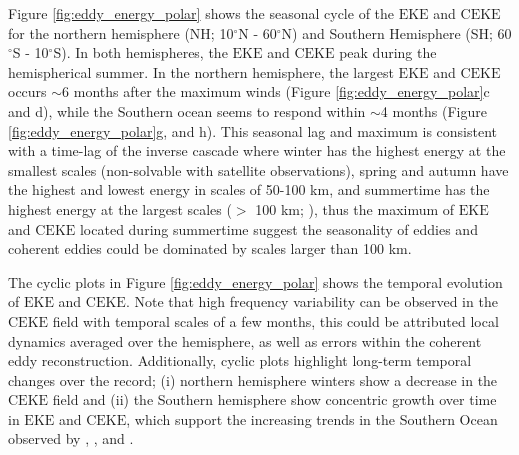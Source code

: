 \documentclass[draft,linenumbers]{agujournal2019}
\newcommand{\EKE}{\textrm{EKE}}
\newcommand{\CEKE}{\textrm{CEKE}}
\begin{document}
	Figure \ref{fig:eddy_energy_polar} shows the seasonal cycle of the $\EKE$ and $\CEKE$ for the northern hemisphere (NH; 10$^\circ$N - 60$^\circ$N) and Southern Hemisphere (SH; 60$^\circ$S - 10$^\circ$S). 
	In both hemispheres, the $\EKE$ and $\CEKE$ peak during the hemispherical summer. In the northern hemisphere, the largest $\EKE$ and $\CEKE$ occurs $\sim$6 months after the maximum winds (Figure \ref{fig:eddy_energy_polar}c and d), while the Southern ocean seems to respond within $\sim$4 months (Figure \ref{fig:eddy_energy_polar}g, and h). This seasonal lag and maximum is consistent with a time-lag of the inverse cascade \citep{Sasaki_seasonal_2014, Qiu_seasonal_2014} where winter has the highest energy at the smallest scales (non-solvable with satellite observations), spring and autumn have the highest and lowest energy in scales of 50-100 km, and summertime has the highest energy at the largest scales ($>$ 100 km; \citealt{Uchida_Seasonality_2017}), thus the maximum of $\EKE$ and $\CEKE$ located during summertime suggest the seasonality of eddies and coherent eddies could be dominated by scales larger than 100 km.

	The cyclic plots in Figure \ref{fig:eddy_energy_polar} shows the temporal evolution of $\EKE$ and $\CEKE$. 
	Note that high frequency variability can be observed in the $\CEKE$ field with temporal scales of a few months, this could be attributed local dynamics averaged over the hemisphere, as well as errors within the coherent eddy reconstruction. 
	Additionally, cyclic plots highlight long-term temporal changes over the record; (i) northern hemisphere winters show a decrease in the $\CEKE$ field and (ii) the Southern hemisphere show concentric growth over time in $\EKE$ and $\CEKE$, which support the increasing trends in the Southern Ocean observed by \citet{Hogg_Recent_2015}, \citet{Martinez_TKE_2019}, and \citet{Martinez_Kinetic_2021}. 
\end{document}
